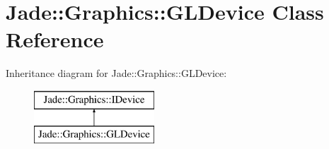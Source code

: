 \hypertarget{class_jade_1_1_graphics_1_1_g_l_device}{}\section{Jade\+:\+:Graphics\+:\+:G\+L\+Device Class Reference}
\label{class_jade_1_1_graphics_1_1_g_l_device}
Inheritance diagram for Jade\+:\+:Graphics\+:\+:G\+L\+Device\+:\begin{figure}[H]
\begin{center}
\leavevmode
\includegraphics[height=2.000000cm]{class_jade_1_1_graphics_1_1_g_l_device}
\end{center}
\end{figure}
